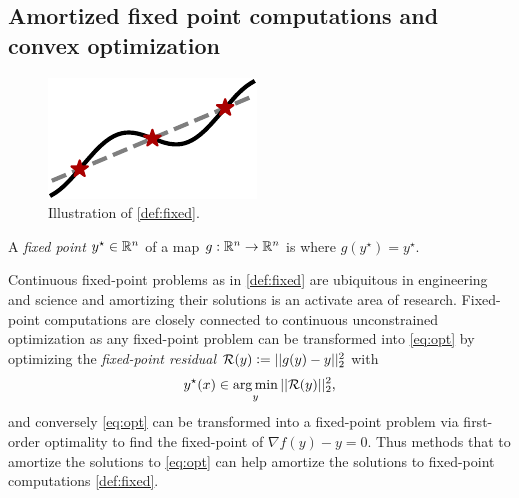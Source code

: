 \documentclass[twoside,11pt]{article}
\begin{document}
\subsection{Amortized fixed point computations and convex optimization}
\label{sec:apps:convex}

\begin{figure}
\vspace{-3mm}
\includegraphics[width=\linewidth]{fig/fp.pdf}
\caption{Illustration of \cref{def:fixed}.}
\vspace{-3mm}
\end{figure}


\begin{definition}
  A \emph{fixed point} $y^\star\in\mathbb{R}^n$ of a map
  $g:\mathbb{R}^n\rightarrow\mathbb{R}^n$ is where $g(y^\star) = y^\star$.
  \label{def:fixed}
\end{definition}

Continuous fixed-point problems as in \cref{def:fixed}
are ubiquitous in engineering and science and
amortizing their solutions is an activate area of research.
Fixed-point computations are closely connected to continuous
unconstrained optimization as any fixed-point problem can be
transformed into \cref{eq:opt} by optimizing the
\emph{fixed-point residual} ${\mathcal{R}}(y)\vcentcolon=||g(y)-y||_2^2$ with
\begin{equation}
  y^\star(x)\in\operatorname*{arg\,min}_y ||{\mathcal{R}}(y)||_2^2,
  \label{eq:fixed-point-opt}
\end{equation}
and conversely \cref{eq:opt} can be transformed into
a fixed-point problem via first-order optimality
to find the fixed-point of
$\nabla f(y) - y = 0$.
Thus methods that to amortize the solutions to \cref{eq:opt}
can help amortize the solutions
to fixed-point computations \cref{def:fixed}.
\end{document}
